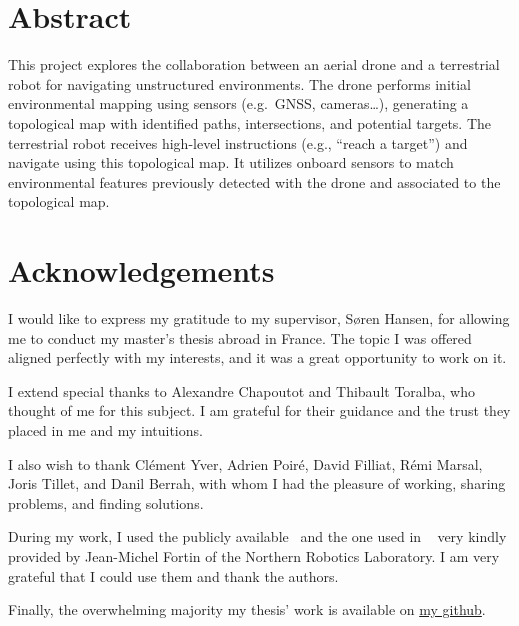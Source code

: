 \section*{Abstract}\label{sec:abstract}

This project explores the collaboration between an aerial drone and a terrestrial robot for navigating unstructured environments.
The drone performs initial environmental mapping using sensors (e.g.\ GNSS, cameras\ldots), generating a topological map with identified paths, intersections, and potential targets.
The terrestrial robot receives high-level instructions (e.g., “reach a target”) and navigate using this topological map.
It utilizes onboard sensors to match environmental features previously detected with the drone and associated to the topological map.

\vspace{5cm}

\section*{Acknowledgements}\label{sec:acknowledgements}

I would like to express my gratitude to my supervisor, Søren Hansen, for allowing me to conduct my master’s thesis abroad in France.
The topic I was offered aligned perfectly with my interests, and it was a great opportunity to work on it.

I extend special thanks to Alexandre Chapoutot and Thibault Toralba, who thought of me for this subject.
I am grateful for their guidance and the trust they placed in me and my intuitions.

I also wish to thank Clément Yver, Adrien Poiré, David Filliat, Rémi Marsal, Joris Tillet, and Danil Berrah,
with whom I had the pleasure of working, sharing problems, and finding solutions.

During my work, I used the publicly available~\cite{noauthor_aukerman_nodate} and the one used in
~\cite{fortin_uav-assisted_2024} very kindly provided by Jean-Michel Fortin of the Northern Robotics Laboratory.
I am very grateful that I could use them and thank the authors.

Finally, the overwhelming majority my thesis' work is available on \href{https://github.com/Seb-sti1/mastersthesis}{my github}.